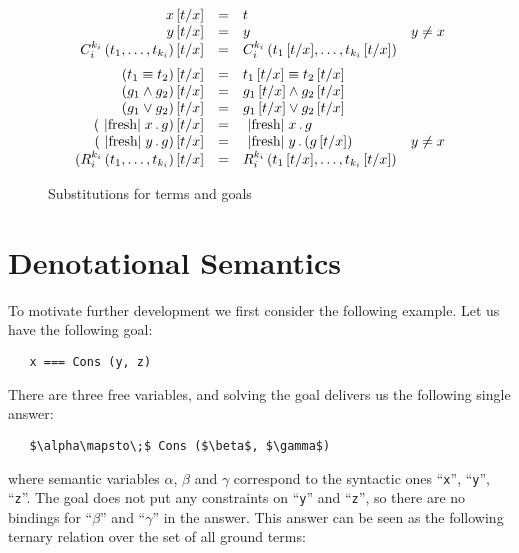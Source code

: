 \begin{figure}[t]
\[
\begin{array}{rcll}
  x\,[t/x] &=& t &\\
  y\,[t/x] &=& y & y\ne x\\
  C_i^{k_i}\,(t_1,\dots,t_{k_i})\,[t/x]&=&C_i^{k_i}\,(t_1\,[t/x],\dots,t_{k_i}\,[t/x])&\\[2mm]
  (t_1 \equiv t_2)\,[t/x]&=&t_1\,[t/x] \equiv t_2\,[t/x]&\\
  (g_1 \wedge g_2)\,[t/x]&=&g_1\,[t/x] \wedge g_2\,[t/x]&\\
  (g_1 \vee g_2)\,[t/x]&=&g_1\,[t/x] \vee g_2\,[t/x]&\\
  (\mbox{\lstinline|fresh|}\;x\,.\,g)\,[t/x]&=&\mbox{\lstinline|fresh|}\;x\,.\,g&\\
  (\mbox{\lstinline|fresh|}\;y\,.\,g)\,[t/x]&=&\mbox{\lstinline|fresh|}\;y\,.\,(g\,[t/x])&y\ne x\\
  (R_i^{k_i}\,(t_1,\dots,t_{k_i})\,[t/x]&=&R_i^{k_i}\,(t_1\,[t/x],\dots,t_{k_i}\,[t/x])&
\end{array}
\]
  \caption{Substitutions for terms and goals}
  \label{substitution}
\end{figure}

\section{Denotational Semantics}
\label{denotational}

To motivate further development we first consider the following example. Let us have the following goal:

\begin{lstlisting}
   x === Cons (y, z)
\end{lstlisting}

There are three free variables, and solving the goal delivers us the following single answer:

\begin{lstlisting}
   $\alpha\mapsto\;$ Cons ($\beta$, $\gamma$)
\end{lstlisting}

where semantic variables $\alpha$, $\beta$ and $\gamma$ correspond to the syntactic ones ``\lstinline|x|'', ``\lstinline|y|'', ``\lstinline|z|''. The
goal does not put any constraints on ``\lstinline|y|'' and ``\lstinline|z|'', so there are no bindings for ``$\beta$'' and ``$\gamma$'' in the answer.
This answer can be seen as the following ternary relation over the set of all ground terms:

